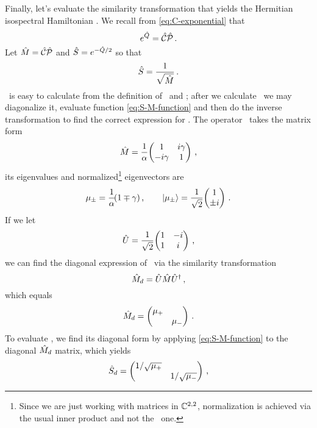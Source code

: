         Finally, let's evaluate the similarity transformation that yields the Hermitian isospectral Hamiltonian \hF. We recall from \eqref{eq:C-exponential} that
        \begin{equation*}
            e^{\hat{Q}} = \mathcal{\hat{C}}\mathcal{\hat{P}}
            \,\text{.}
        \end{equation*}
        Let $\hat{M} = \mathcal{\hat{C}}\mathcal{\hat{P}}$ and $\hat{S} = e^{-\hat{Q}/2}$ so that
        \begin{equation}
            \label{eq:S-M-function}
            \hat{S} = \frac{1}{\sqrt{\hat{M}}}
            \,\text{.}
        \end{equation}
        \hM\ is easy to calculate from the definition of \hC\ and \hP; after we calculate \hM\ we may diagonalize it, evaluate function \eqref{eq:S-M-function} and then do the inverse transformation to find the correct expression for \hS. The operator \hM\ takes the matrix form
        \begin{equation*}
            \hM = \frac{1}{\alpha}\!\pmqty{\admat[1]{i\gamma, -i\gamma}}
            \mycomma
        \end{equation*}
        its eigenvalues and normalized\footnote{Since we are just working with matrices in $\mathbb{C}^{2,2}$, normalization is achieved via the usual inner product and not the \PT\ one.} eigenvectors are
        \begin{equation*}
            \mu_{\pm} = \frac{1}{\alpha}\!\pqty{1 \mp \gamma}
            \mycomma
            \qquad
            \ket{\mu_\pm} = \frac{1}{\sqrt{2}}\!\pmqty{1 \\ \pm i}
            \myperiod
        \end{equation*}
        If we let
        \begin{equation*}
            \hU = \frac{1}{\sqrt{2}}\!\pmqty{1 & -i \\ 1 & i}
            \mycomma
        \end{equation*}
        we can find the diagonal expression of \hM\ via the similarity transformation
        \begin{equation}
            \hat{M}_d = \hat{U} \hat{M} \hat{U}^\dag
            \,\text{,}
        \end{equation}
        which equals
        \begin{equation*}
            \hM_d = \pmqty{\dmat{\mu_{+}, \mu_{-}}}
            \myperiod
        \end{equation*}
        To evaluate \hS, we find its diagonal form by applying \eqref{eq:S-M-function} to the diagonal $\hat{M}_d$ matrix, which yields
        \begin{equation*}
            \hS_d = \pmqty{\dmat{1/\sqrt{\mu_{+}}, 1/\sqrt{\mu_{-}}}}
            \mycomma
        \end{equation*}
